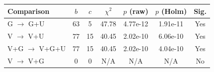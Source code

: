 \begin{tabular}{lcccccc}
\toprule
Comparison & $b$ & $c$ & $\chi^2$ & $p$ (raw) & $p$ (Holm) & Sig. \\
\midrule
G $\to$ G+U & 63 & 5 & 47.78 & 4.77e-12 & 1.91e-11 & Yes \\
V $\to$ V+U & 77 & 15 & 40.45 & 2.02e-10 & 6.06e-10 & Yes \\
V+G $\to$ V+G+U & 77 & 15 & 40.45 & 2.02e-10 & 4.04e-10 & Yes \\
V $\to$ V+G & 0 & 0 & N/A & N/A & N/A & No \\
\bottomrule
\end{tabular}